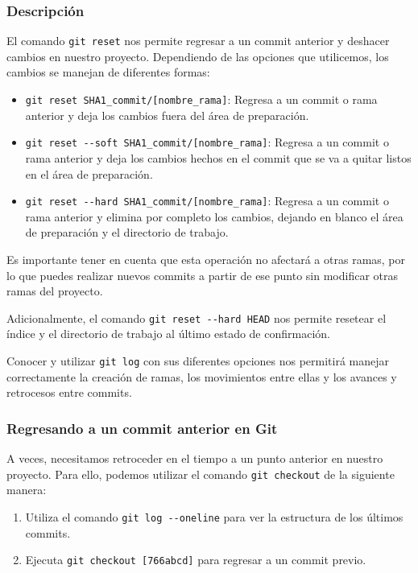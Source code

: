 \documentclass[
  a4paper,
]{article}
\providecommand{\tightlist}{%
  \setlength{\itemsep}{0pt}\setlength{\parskip}{0pt}}\usepackage{longtable,booktabs,array}
\begin{document}
\subsubsection{Descripción}\label{descripciuxf3n-2}

El comando \texttt{git\ reset} nos permite regresar a un commit anterior
y deshacer cambios en nuestro proyecto. Dependiendo de las opciones que
utilicemos, los cambios se manejan de diferentes formas:

\begin{itemize}
\item
  \texttt{git\ reset\ SHA1\_commit/{[}nombre\_rama{]}}: Regresa a un
  commit o rama anterior y deja los cambios fuera del área de
  preparación.
\item
  \texttt{git\ reset\ -\/-soft\ SHA1\_commit/{[}nombre\_rama{]}}:
  Regresa a un commit o rama anterior y deja los cambios hechos en el
  commit que se va a quitar listos en el área de preparación.
\item
  \texttt{git\ reset\ -\/-hard\ SHA1\_commit/{[}nombre\_rama{]}}:
  Regresa a un commit o rama anterior y elimina por completo los
  cambios, dejando en blanco el área de preparación y el directorio de
  trabajo.
\end{itemize}

Es importante tener en cuenta que esta operación no afectará a otras
ramas, por lo que puedes realizar nuevos commits a partir de ese punto
sin modificar otras ramas del proyecto.

Adicionalmente, el comando \texttt{git\ reset\ -\/-hard\ HEAD} nos
permite resetear el índice y el directorio de trabajo al último estado
de confirmación.

Conocer y utilizar \texttt{git\ log} con sus diferentes opciones nos
permitirá manejar correctamente la creación de ramas, los movimientos
entre ellas y los avances y retrocesos entre commits.

\subsubsection{Regresando a un commit anterior en
Git}\label{regresando-a-un-commit-anterior-en-git}

A veces, necesitamos retroceder en el tiempo a un punto anterior en
nuestro proyecto. Para ello, podemos utilizar el comando
\texttt{git\ checkout} de la siguiente manera:

\begin{enumerate}
\def\labelenumi{\arabic{enumi}.}
\tightlist
\item
  Utiliza el comando \texttt{git\ log\ -\/-oneline} para ver la
  estructura de los últimos commits.
\item
  Ejecuta \texttt{git\ checkout\ {[}766abcd{]}} para regresar a un
  commit previo.
\end{enumerate}
\end{document}
